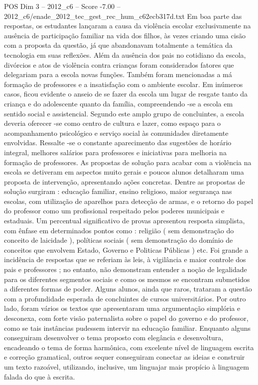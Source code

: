 \begin{textsample}{POS Dim 3 – 2012\_c6 – Score -7.00 – 2012\_c6/enade\_2012\_tec\_gest\_rec\_hum\_c62ecb317d.txt}
Em boa parte das respostas, os estudantes lançaram a causa da violência escolar exclusivamente na ausência de participação familiar na vida dos filhos, às vezes criando uma cisão com a proposta da questão, já que abandonavam totalmente a temática da tecnologia em suas reflexões.
Além da ausência dos pais no cotidiano da escola, divórcios e atos de violência contra crianças foram considerados fatores que delegariam para a escola novas funções.
Também foram mencionadas a má formação de professores e a insatisfação com o ambiente escolar.
Em inúmeros casos, ficou evidente o anseio de se fazer da escola um lugar de resgate tanto da criança e do adolescente quanto da família, compreendendo -se a escola em sentido social e assistencial.
Segundo este amplo grupo de concluintes, a escola deveria oferecer -se como centro de cultura e lazer, como espaço para o acompanhamento psicológico e serviço social às comunidades diretamente envolvidas.
Ressalte -se o constante aparecimento das sugestões de horário integral, melhores salários para professores e iniciativas para melhoria na formação de professores.
As propostas de solução para acabar com a violência na escola se detiveram em aspectos muito gerais e poucos alunos detalharam uma proposta de intervenção, apresentando ações concretas.
Dentre as propostas de solução surgiram : educação familiar, ensino religioso, maior segurança nas escolas, com utilização de aparelhos para detecção de armas, e o retorno do papel do professor como um profissional respeitado pelos poderes municipais e estaduais.
Um percentual significativo de provas apresentou resposta simplista, com ênfase em determinados pontos como : religião ( sem demonstração do conceito de laicidade ), políticas sociais ( sem demonstração do domínio de conceitos que envolvem Estado, Governo e Politicas Públicas ) etc.
Foi grande a incidência de respostas que se referiam às leis, à vigilância e maior controle dos pais e professores ; no entanto, não demonstram entender a noção de legalidade para os diferentes segmentos sociais e como os mesmos se encontram submetidos a diferentes formas de poder.
Alguns alunos, ainda que raros, trataram a questão com a profundidade esperada de concluintes de cursos universitários.
Por outro lado, foram vários os textos que apresentaram uma argumentação simplória e desconexa, com forte visão paternalista sobre o papel do governo e do professor, como se tais instâncias pudessem intervir na educação familiar.
Enquanto alguns conseguiram desenvolver o tema proposto com elegância e desenvoltura, encadeando o tema de forma harmônica, com excelente nível de linguagem escrita e correção gramatical, outros sequer conseguiram conectar as ideias e construir um texto razoável, utilizando, inclusive, um linguajar mais propício à linguagem falada do que à escrita.

\end{textsample}
